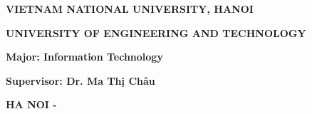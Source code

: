 \begin{center}\adddecorativeborder
    \thispagestyle{plain}
    
    {\large\textbf{VIETNAM NATIONAL UNIVERSITY, HANOI}\par}
    {\large\textbf{UNIVERSITY OF ENGINEERING AND TECHNOLOGY}\par}
    \vspace{1cm}

    {\Large\bfseries \AuthorName \par}

    \vspace{2cm}

    {\LARGE\bfseries\MakeUppercase{\ProjectName} \par}
    \vspace{0.5cm}
    {\normalsize\bfseries \MakeUppercase{\ProjectNameEng} \par}
     
    \vspace{2cm}

    {\Large\bfseries Major: Information Technology\par}
    
    \vspace{3cm}

    \begin{flushleft}
    {\Large\bfseries Supervisor: Dr. Ma Thị Châu\par}
    \end{flushleft}
    
    \vspace{1.5cm}
    

    \vfill
    
    {\large\bfseries HA NOI - \the\year{} \par}
\end{center}